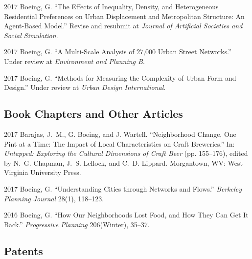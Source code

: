 \documentclass{academiccv}
\begin{document}
\begin{tablist}

\item[2017] \tab Boeing, G. \enquote{The Effects of Inequality, Density, and Heterogeneous Residential Preferences on Urban Displacement and Metropolitan Structure: An Agent-Based Model.} Revise and resubmit at \emph{Journal of Artificial Societies and Social Simulation}.

\item[2017] \tab Boeing, G. \enquote{A Multi-Scale Analysis of 27,000 Urban Street Networks.} Under review at \emph{Environment and Planning B}.

\item[2017] \tab Boeing, G. \enquote{Methods for Measuring the Complexity of Urban Form and Design.} Under review at \emph{Urban Design International}.

\end{tablist}



\subsection*{Book Chapters and Other Articles}

\begin{tablist}

\item[2017] \tab Barajas, J.~M., G. Boeing, and J. Wartell. \enquote{Neighborhood Change, One Pint at a Time: The Impact of Local Characteristics on Craft Breweries.} In: \emph{Untapped: Exploring the Cultural Dimensions of Craft Beer} (pp. 155--176), edited by N.~G. Chapman, J.~S. Lellock, and C.~D. Lippard. Morgantown, WV: West Virginia University Press.

\item[2017] \tab Boeing, G. \enquote{Understanding Cities through Networks and Flows.} \emph{Berkeley Planning Journal} 28(1), 118--123.

\item[2016] \tab Boeing, G. \enquote{How Our Neighborhoods Lost Food, and How They Can Get It Back.} \emph{Progressive Planning} 206(Winter), 35--37.

\end{tablist}



\subsection*{Patents}
\end{document}
